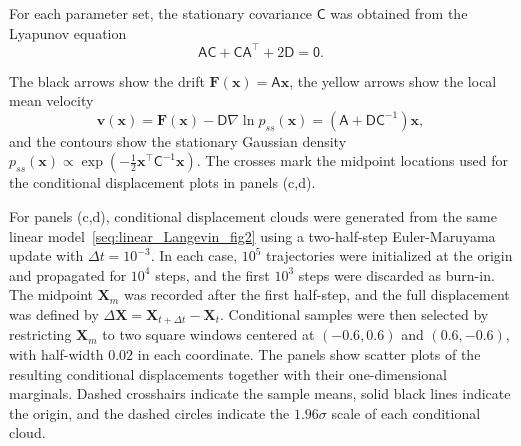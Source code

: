 \documentclass[
 longbibliography,
 twocolumn,
 superscriptaddress,
 amsmath,
 amssymb,
 amsthm,
 amsfonts,
 prl,
 floatfix,
]{revtex4-2}
\newcommand{\matbf}[1]{\boldsymbol{\mathsf{#1}}}
\begin{document}
\begin{widetext}
For each parameter set, the stationary covariance $\matbf C$ was obtained from the Lyapunov equation
\begin{equation}
    \matbf A\matbf C+\matbf C\matbf A^\intercal+2\matbf D=\matbf 0.
    \label{seq:lyapunov_equation}
\end{equation}

The black arrows show the drift $\bm F(\bm x)=\matbf A\bm x$, the yellow arrows show the local mean velocity
\begin{equation}
    \bm v(\bm x)=\bm F(\bm x)-\matbf D\nabla\ln p_{ss}(\bm x)
    =(\matbf A+\matbf D\matbf C^{-1})\bm x,
    \label{seq:cal_v_linear}
\end{equation}
and the contours show the stationary Gaussian density $p_{ss}(\bm x)\propto\exp\left(-\frac{1}{2}\bm x^\intercal\matbf C^{-1}\bm x\right)$.
The crosses mark the midpoint locations used for the conditional displacement plots in panels (c,d).

For panels (c,d), conditional displacement clouds were generated from the same linear model~\eqref{seq:linear_Langevin_fig2} using a two-half-step Euler-Maruyama update with $\Delta t=10^{-3}$. In each case, $10^5$ trajectories were initialized at the origin and propagated for $10^4$ steps, and the first $10^3$ steps were discarded as burn-in. The midpoint $\bm X_m$ was recorded after the first half-step, and the full displacement was defined by $\Delta\bm X=\bm X_{t+\Delta t}-\bm X_t$. Conditional samples were then selected by restricting $\bm X_m$ to two square windows centered at $(-0.6,0.6)$ and $(0.6,-0.6)$, with half-width $0.02$ in each coordinate. The panels show scatter plots of the resulting conditional displacements together with their one-dimensional marginals. Dashed crosshairs indicate the sample means, solid black lines indicate the origin, and the dashed circles indicate the $1.96\sigma$ scale of each conditional cloud.


\end{widetext}
\end{document}
